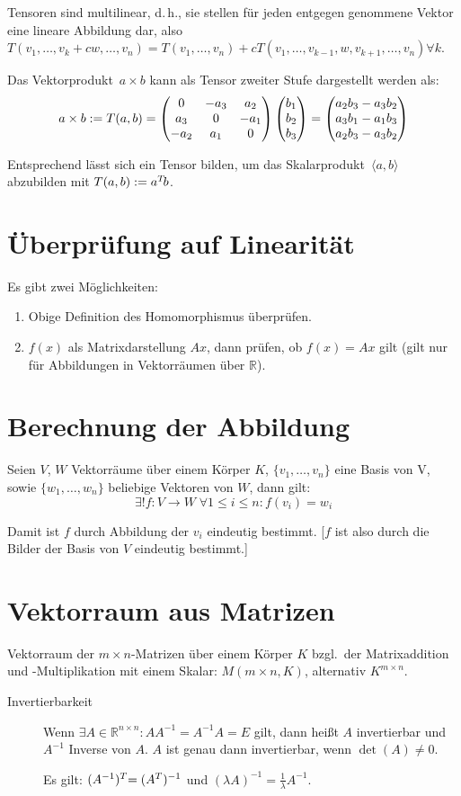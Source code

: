 Tensoren sind multilinear, d.\,h., sie stellen für jeden entgegen genommene Vektor eine lineare Abbildung dar, also~$T(v_1, \ldots, v_k + cw, \ldots, v_n) = T(v_1, \ldots, v_n) + cT(v_1, \ldots, v_{k-1}, w, v_{k+1}, \ldots, v_n) \forall k$.

Das Vektorprodukt~$a \times b$ kann als Tensor zweiter Stufe dargestellt werden als:
\[
    a \times b := T(a,b) = \begin{pmatrix}
    	0    & -a_3 & a_2  \\
    	a_3  & 0    & -a_1 \\
    	-a_2 & a_1  & 0
    \end{pmatrix} \veccc(b_1;b_2;b_3)
    = \veccc(a_2 b_3 - a_3 b_2; a_3 b_1 - a_1 b_3; a_2 b_3 - a_3 b_2)
\]

Entsprechend lässt sich ein Tensor bilden, um das Skalarprodukt~$\langle a, b \rangle$ abzubilden mit $T(a,b) := a\T b$.

\section{Überprüfung auf Linearität}

Es gibt zwei Möglichkeiten:
\begin{enumerate}
  \item Obige Definition des Homomorphismus überprüfen.
  \item $f(x)$ als Matrixdarstellung $Ax$, dann prüfen, ob $f(x)=Ax$ gilt (gilt nur für Abbildungen in Vektorräumen über $\mathbb{R}$).
\end{enumerate}

\section{Berechnung der Abbildung}

Seien $V$, $W$ Vektorräume über einem Körper $K$, $\{v_1,\ldots,v_n\}$ eine Basis von V, sowie $\{w_1,\ldots,w_n\}$ beliebige Vektoren von $W$, dann gilt:
\[ \exists! f:V \to W\;\forall1\leq i\leq n:f(v_{i})=w_{i} \]

Damit ist $f$ durch Abbildung der $v_i$ eindeutig bestimmt.
[$f$ ist also durch die Bilder der Basis von $V$ eindeutig bestimmt.]


\section{Vektorraum aus Matrizen}

Vektorraum der $m\times n$-Matrizen über einem Körper $K$ bzgl.~der Matrixaddition und -Multiplikation mit einem Skalar: $M(m\times n,K)$, alternativ $K^{m\times n}$.
\begin{description}
  \item [{Invertierbarkeit}]
	Wenn $\exists A\in\mathbb{R}^{n\times n}:AA^{-1}=A^{-1}A=E$ gilt, dann heißt $A$ invertierbar
	und $A^{-1}$ Inverse von $A$. $A$ ist genau dann invertierbar, wenn $\det(A)\neq0$.

	Es gilt: $(A^{-1})\t = (A^T)^{-1}$ und $(\lambda A)^{-1}=\frac{1}{\lambda}A^{-1}$.
\end{description}
